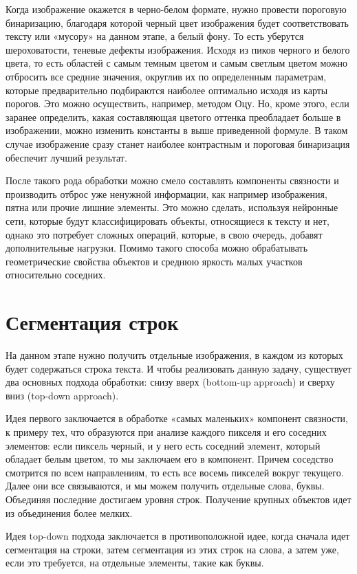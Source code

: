 Когда изображение окажется в черно-белом формате, нужно провести пороговую бинаризацию, благодаря которой черный цвет изображения будет соответствовать тексту или «мусору» на данном этапе, а белый фону. То есть уберутся шероховатости, теневые дефекты изображения. Исходя из пиков черного и белого цвета, то есть областей с самым темным цветом и самым светлым цветом можно отбросить все средние значения, округлив их по определенным параметрам, которые предварительно подбираются наиболее оптимально исходя из карты порогов. Это можно осуществить, например, методом Оцу.\cite{otzu} Но, кроме этого, если заранее определить, какая составляющая цветого оттенка преобладает больше в изображении, можно изменить константы в выше приведенной формуле. В таком случае изображение сразу станет наиболее контрастным и пороговая бинаризация обеспечит лучший результат.

После такого рода обработки можно смело составлять компоненты связности и производить отброс уже ненужной информации, как например изображения, пятна или прочие лишние элементы. Это можно сделать, используя нейронные сети, которые будут классифицировать объекты, относящиеся к тексту и нет, однако это потребует сложных операций, которые, в свою очередь, добавят дополнительные нагрузки. Помимо такого способа можно обрабатывать геометрические свойства объектов и среднюю яркость малых участков относительно соседних.

\section{Сегментация строк}

На данном этапе нужно получить отдельные изображения, в каждом из которых будет содержаться строка текста. И чтобы реализовать данную задачу, существует два основных подхода обработки: снизу вверх (bottom-up approach) и сверху вниз (top-down approach).

Идея первого заключается в обработке «самых маленьких» компонент связности, к примеру тех, что образуются при анализе каждого пикселя и его соседних элементов: если пиксель черный, и у него есть соседний элемент, который обладает белым цветом, то мы заключаем его в компонент. Причем соседство смотрится по всем направлениям, то есть все восемь пикселей вокруг текущего. Далее они все связываются, и мы можем получить отдельные слова, буквы. Объединяя последние достигаем уровня строк. Получение крупных объектов идет из объединения более мелких.
 
Идея top-down подхода заключается в противоположной идее, когда сначала идет сегментация на строки, затем сегментация из этих строк на слова, а затем уже, если это требуется, на отдельные элементы, такие как буквы.

